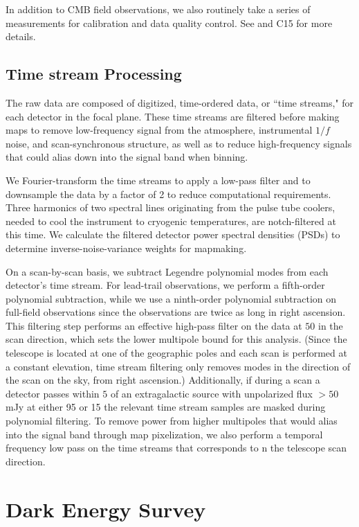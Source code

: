 \documentclass[usenatbib, twocolumn, nofootinbib, reprint, emulateapj, amsart]{revtex4-1}
\begin{document}
In addition to CMB field observations, we also routinely take a series of measurements for calibration and data quality control.  See \citet{schaffer11} and C15 for more details.

\subsection{Time stream Processing}
The raw data are composed of digitized, time-ordered  data, or ``time streams," for each detector in the focal plane.
These time streams are filtered before making maps to remove low-frequency signal from the atmosphere, instrumental $1/f$ noise, and scan-synchronous structure, as well as to reduce high-frequency signals that could alias down into the signal band when binning.

We Fourier-transform the time streams to apply a low-pass filter and to downsample the data by a factor of 2 to reduce computational requirements.
Three harmonics of two spectral lines originating from the pulse tube coolers, needed to cool the instrument to cryogenic temperatures, are notch-filtered at this time.
We calculate the filtered detector power spectral densities (PSDs) to determine inverse-noise-variance weights for mapmaking.

On a scan-by-scan basis, we subtract Legendre polynomial modes from each detector's time stream.
For lead-trail observations, we perform a fifth-order polynomial subtraction, while we use a ninth-order polynomial subtraction on full-field observations since the observations are twice as long in right ascension.
This filtering step performs an effective high-pass filter on the data at $ 50$ in the scan direction, which sets the lower multipole bound for this analysis.
(Since the telescope is located at one of the geographic poles and each scan is performed at a constant elevation, time stream filtering only removes modes in the direction of the scan on the sky, from right ascension.)
Additionally, if during a scan a detector passes within $5$ of an extragalactic source with unpolarized flux $> 50$\,mJy at either 95 or 15 the relevant time stream samples are masked during polynomial filtering.
To remove power from higher multipoles that would alias into the signal band through map pixelization, we also perform a temporal frequency low pass on the time streams that corresponds to n the telescope scan direction.


\section{Dark Energy Survey}
\end{document}
